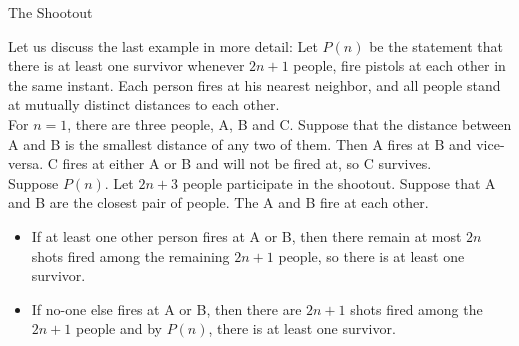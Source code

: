 \documentclass[smaller,hyperref={CJKbookmarks=true}]{beamer}
\begin{document}
\begin{frame}[t]{The Shootout}
\begin{spacing}{1.1}
Let us discuss the last example in more detail: Let $P(n)$ be the statement
that there is at least one survivor whenever $2n+1$ people, fire pistols at
each other in the same instant. Each person fires at his nearest neighbor,
and all people stand at mutually distinct distances to each other.\\[5pt]
For $n=1$, there are three people, A, B and C. Suppose that the distance between A and B is the smallest distance of any two of them. Then A fires at B and vice-versa. C fires at either A or B and will not be fired at, so C survives.\\[5pt]
Suppose $P(n)$. Let $2n+3$ people participate in the shootout. Suppose that
A and B are the closest pair of people. The A and B fire at each other.
\begin{itemize}
  \item If at least one other person fires at A or B, then there remain at most
      $2n$ shots fired among the remaining $2n + 1$ people, so there is at least
      one survivor.
  \item If no-one else fires at A or B, then there are $2n+1$ shots fired among the $2n+1$ people and by $P(n)$, there is at least one survivor.
\end{itemize}
\end{spacing}
\end{frame}
\end{document}
